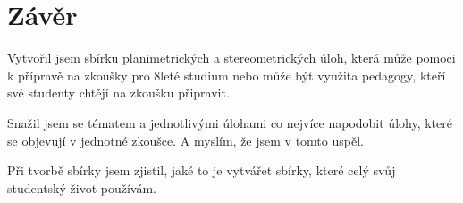 \chapter*{Závěr}

Vytvořil jsem sbírku planimetrických a stereometrických úloh, která může pomoci k přípravě na zkoušky pro 8leté studium nebo může být využita pedagogy, kteří své studenty chtějí na zkoušku připravit.

Snažil jsem se tématem a jednotlivými úlohami co nejvíce napodobit úlohy, které se objevují v jednotné zkoušce. A myslím, že jsem v tomto uspěl.

Při tvorbě sbírky jsem zjistil, jaké to je vytvářet sbírky, které celý svůj studentský život používám.
